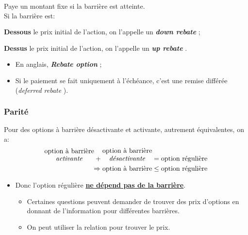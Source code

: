 \documentclass[10pt, french]{article}
\begin{document}
\begin{multicols*}{2}
\begin{definitionNOHFILLsub}
Paye un montant fixe si la barrière est atteinte.\\

Si la barrière est:
\begin{description}
	\item	\textbf{Dessous} le prix initial de l'action, on l'appelle un \og \textit{\textbf{down rebate}} \fg{};
	\item	\textbf{Dessus} le prix initial de l'action, on l'appelle un \og \textit{\textbf{up rebate}} \fg{}.
\end{description}

\tcbline

\begin{itemize}[leftmargin = *]
	\item	En anglais, \og \textit{\textbf{Rebate option}} \fg{};
	\item	Si le paiement se fait uniquement à l'échéance, c'est une remise différée (\og \textit{deferred rebate} \fg{}).
\end{itemize}
\end{definitionNOHFILLsub}

\subsubsection*{Parité}
Pour des options à barrière désactivante et activante, autrement équivalentes, on a:
\begin{align*}
	\shortstack{option à barrière\\ \textit{activante}}	+ \shortstack{option à barrière\\ \textit{désactivante}}
	&=	\shortstack{option régulière}	\\
	\Rightarrow
	\shortstack{option à barrière}	
	&\leq	\shortstack{option régulière}	
\end{align*} 
\begin{itemize}[leftmargin = *]
	\item	Donc l'option régulière \textbf{\underline{ne dépend pas de la barrière}}.
		\begin{itemize}
		\item	Certaines questions peuvent demander de trouver des prix d'options en donnant de l'information pour différentes barrières.
		\item	On peut utiliser la relation pour trouver le prix.
		\end{itemize}
\end{itemize}


\end{multicols*}
\end{document}
